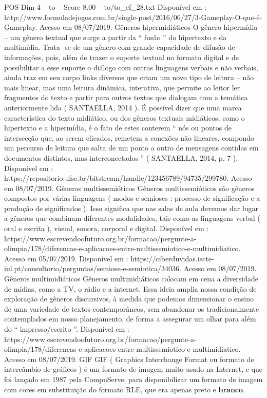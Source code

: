 \begin{textsample}{POS Dim 4 – to – Score 8.00 – to/to\_ef\_28.txt}
Disponível em : http://www.formuladejogos.com.br/single-post/2016/06/27/3-Gameplay-O-que-é-Gameplay.
Acesso em 08/07/2019.
Gêneros hipermidiáticos O gênero hipermídia – um gênero textual que surge a partir da “ fusão ” do hipertexto e da multimídia.
Trata -se de um gênero com grande capacidade de difusão de informações, pois, além de trazer o suporte textual no formato digital e de possibilitar a esse suporte o diálogo com outras linguagens verbais e não verbais, ainda traz em seu corpo links diversos que criam um novo tipo de leitura – não mais linear, mas uma leitura dinâmica, interativa, que permite ao leitor ler fragmentos do texto e partir para outros textos que dialogam com a temática anteriormente lida ( SANTAELLA, 2014 ).
É possível dizer que uma marca característica do texto midiático, ou dos gêneros textuais midiáticos, como o hipertexto e a hipermídia, é o fato de estes conterem “ nós ou pontos de intersecção que, ao serem clicados, remetem a conexões não lineares, compondo um percurso de leitura que salta de um ponto a outro de mensagens contidas em documentos distintos, mas interconectados ” ( SANTAELLA, 2014, p. 7 ).
Disponível em : https://repositorio.ufsc.br/bitstream/handle/123456789/94735/299780.
Acesso em 08/07/2019.
Gêneros multissemióticos Gêneros multissemióticos são gêneros compostos por várias linguagens ( modos e semioses : processo de significação e a produção de significados ).
Isso significa que nas salas de aula devemos dar lugar a gêneros que combinam diferentes modalidades, tais como as linguagens verbal ( oral e escrita ), visual, sonora, corporal e digital.
Disponível em : https://www.escrevendoofuturo.org.br/formacao/pergunte-a-olimpia/178/diferencas-e-aplicacoes-entre-multissemiotico-e-multimidiatico.
Acesso em 05/07/2019.
Disponível em : https://ciberduvidas.iscte-iul.pt/consultorio/perguntas/semiose-e-semiotica/34036.
Acesso em 08/07/2019.
Gêneros multimidiáticos Gêneros multimidiáticos colocam em cena a diversidade de mídias, como a TV, o rádio e a internet.
Essa ideia amplia nossa condição de exploração de gêneros discursivos, à medida que podemos dimensionar o ensino de uma variedade de textos contemporâneos, sem abandonar os tradicionalmente contemplados em nosso planejamento, de forma a assegurar um olhar para além do “ impresso/escrito ”.
Disponível em : https://www.escrevendoofuturo.org.br/formacao/pergunte-a-olimpia/178/diferencas-e-aplicacoes-entre-multissemiotico-e-multimidiatico.
Acesso em 08/07/2019.
GIF GIF ( Graphics Interchange Format ou formato de intercâmbio de gráficos ) é um formato de imagem muito usado na Internet, e que foi lançado em 1987 pela CompuServe, para disponibilizar um formato de imagem com cores em substituição do formato RLE, que era apenas preto e \textbf{branco}.

\end{textsample}
